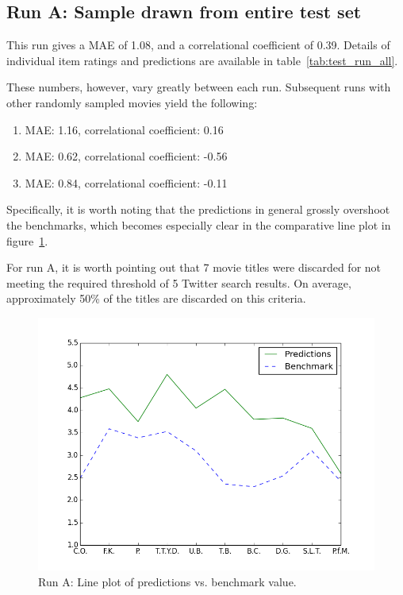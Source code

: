 \subsection{Run A: Sample drawn from entire test set}

This run gives a MAE of 1.08, and a correlational coefficient of 0.39. Details of individual item ratings and predictions are available in table~\ref{tab:test_run_all}.

These numbers, however, vary greatly between each run. Subsequent runs with other randomly sampled movies yield the following:

\begin{enumerate}
  \item MAE: 1.16, correlational coefficient: 0.16
  \item MAE: 0.62, correlational coefficient: -0.56
  \item MAE: 0.84, correlational coefficient: -0.11
\end{enumerate}

Specifically, it is worth noting that the predictions in general grossly overshoot the benchmarks, which becomes especially clear in the comparative line plot in figure~\ref{fig:predictions_benchmark_rand}.

For run A, it is worth pointing out that 7 movie titles were discarded for not meeting the required threshold of 5 Twitter search results. On average, approximately 50\% of the titles are discarded on this criteria.

\begin{figure}[h]
  \centering
    \includegraphics[width=.8\textwidth]{Figures/plots/predictions_benchmark_rand}
  \caption{Run A: Line plot of predictions vs. benchmark value.}
  \label{fig:predictions_benchmark_rand}
\end{figure}

